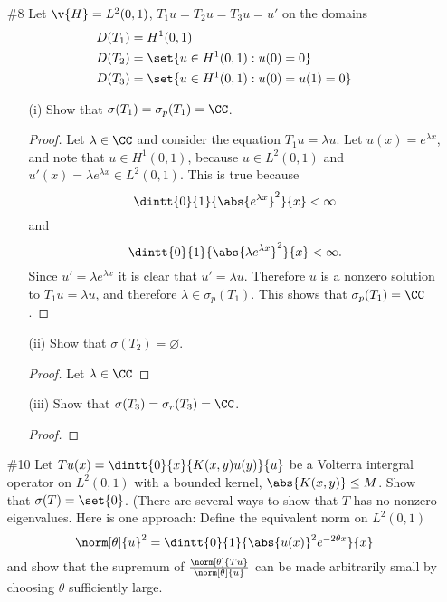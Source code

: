 \documentclass[11pt, oneside]{article}
\begin{document}
\begin{enumerate}
  \pagebreak
  \item[\#8]
    Let $\v{H} = L^2(0, 1)$, $T_1 u = T_2 u = T_3 u = u'$ on the domains
    \begin{align*}
      D(T_1) &= H^1(0, 1) \\
      D(T_2) &= \set{u \in H^1(0,1): u(0) = 0} \\
      D(T_3) &= \set{u \in H^1(0, 1): u(0) = u(1) = 0}
    \end{align*}
    \begin{enumerate}
      \item[(i)] %
        Show that $\sigma(T_1) = \sigma_p(T_1) = \CC$.

        \begin{proof}
          Let $\lambda \in \CC$ and consider the equation $T_1 u = \lambda u$.
          Let $u(x) = e^{\lambda x}$, and note that $u \in H^1(0, 1)$,
          because $u \in L^2(0, 1)$ and $u'(x) = \lambda e^{\lambda x} \in L^2(0, 1)$.
          This is true because
          \[
            \dintt{0}{1}{\abs{e^{\lambda x}}^2}{x} < \infty
          \]
          and
          \[
            \dintt{0}{1}{\abs{\lambda e^{\lambda x}}^2}{x} < \infty.
          \]
          Since $u' = \lambda e^{\lambda x}$ it is clear that $u' = \lambda u$.
          Therefore $u$ is a nonzero solution to $T_1 u = \lambda u$, and
          therefore $\lambda \in \sigma_p(T_1)$.
          This shows that $\sigma_p(T_1) = \CC$.
        \end{proof}

      \item[(ii)]
        Show that $\sigma(T_2) = \varnothing$.

        \begin{proof}
          Let $\lambda \in \CC$ 
        \end{proof}

      \item[(iii)]
        Show that $\sigma(T_3) = \sigma_r(T_3) = \CC$.

        \begin{proof}
          
        \end{proof}
    \end{enumerate}

  \pagebreak
  \item[\#10]
    Let $Tu(x) = \dintt{0}{x}{K(x, y)u(y)}{u}$ be a Volterra intergral operator
    on $L^2(0, 1)$ with a bounded kernel, $\abs{K(x, y)} \le M$.
    Show that $\sigma(T) = \set{0}$.
    (There are several ways to show that $T$ has no nonzero eigenvalues.
    Here is one approach: Define the equivalent norm on $L^2(0, 1)$
    \[
      \norm[\theta]{u}^2 = \dintt{0}{1}{\abs{u(x)}^2e^{-2\theta x}}{x}
    \]
    and show that the supremum of $\frac{\norm[\theta]{Tu}}{\norm[\theta]{u}}$
    can be made arbitrarily small by choosing $\theta$ sufficiently large.


\end{enumerate}
\end{document}
